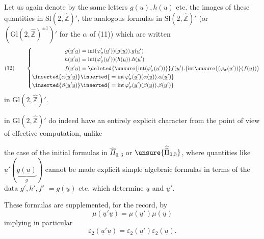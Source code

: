 Let us again denote by the same letters $g(u),h(u)$ etc. the images of these quantities in $\mathrm{Sl}(2,\widehat{\mathbb Z})'$,  the analogous formulas in $\mathrm{Sl}(2,\widehat{\mathbb Z})'$ (or $(\mathrm{Gl}(2,\widehat{\mathbb Z})^{\pm1})'$ for  the $\alpha$ of (11)) which are written
\[
(12)\qquad\left\{\begin{aligned}
g(\underline u'\underline u)&=\mathrm{int}(\varphi_\sigma'(\underline u'))(g(\underline u)).g(\underline u')\\
h(\underline u'\underline u)&=\mathrm{int}(\varphi_\sigma'(\underline u'))(h(\underline u)).h(\underline u')\\
f(\underline u'\underline u)&=\deleted{\unsure{\mathrm{int}(\varphi_\sigma'(\underline u'))}}f(\underline u').\bigl(\mathrm{int}\unsure{(\varphi_\sigma(\underline u'))}(f(\underline u))\bigr)\\
\inserted{\alpha(\underline u'\underline u)}&\inserted{{}=\mathrm{int}\,\varphi_\sigma'(\underline u')(\alpha(\underline u)).\alpha(\underline u')}\\
\inserted{\beta(\underline u'\underline u)}&\inserted{{}=\mathrm{int}\,\varphi_\sigma'(\underline u')(\beta(\underline u)).\beta(\underline u')}
\end{aligned}\right.
\]
in $\mathrm{Gl}(2,\widehat{\mathbb Z})'$.

 in $\mathrm{Gl}(2,\widehat{\mathbb Z})'$ do indeed have an entirely explicit character from the point of view of effective computation, unlike


the case of the initial formulas in $\widehat{\Pi}_{0,3}$ or $\unsure{\widehat{\widetilde{\Pi}}_{0,3}}$, where quantities like $\underline{u}'(\underbrace{g(\underline{u})}_{g})$ cannot be made explicit   simple algebraic formulas in terms of the data  $g',h',f'$  $=g(\underline{u})$ etc. which determine $\underline{u}$ and $\underline{u}'$.

These formulas are supplemented, for the record, by
\[
\tag{13}
\mu(\underline{u}'\underline{u})=\mu(\underline{u}')\mu(\underline{u})
\]
implying in particular
\[
\tag{14}
\varepsilon_2(\underline{u}'\underline{u})=\varepsilon_2(\underline{u}')\varepsilon_2(\underline{u}).
\]

